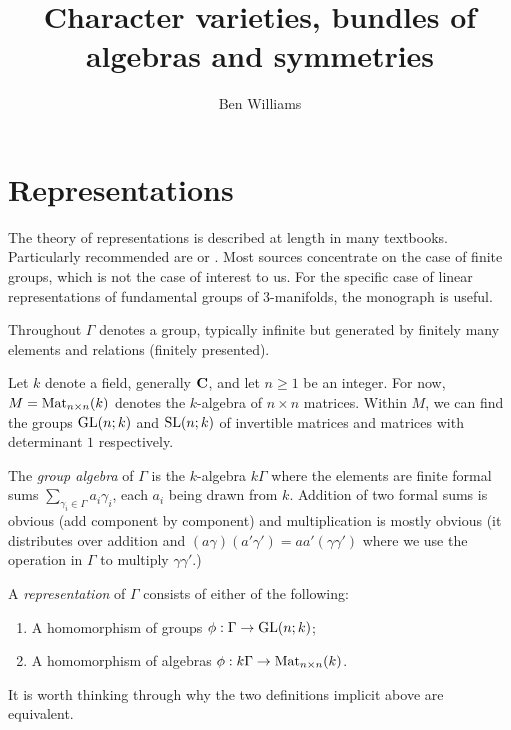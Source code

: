 \documentclass[11pt, oneside, usenames, dvipsnames, svgnames, table, final]{amsart}
\begin{document}
   

\title{Character varieties, bundles of algebras and symmetries}
\author{Ben Williams} %
\address{Department of Mathematics, University of British Columbia, Vancouver~BC V6T~1Z2, Canada}





\maketitle



\section{Representations} \label{sec:Introduction}

The theory of representations is described at length in many textbooks. Particularly recommended are \cite[Ch.~1,2 and 6]{Serre1977} or \cite{Harris2013}. Most sources concentrate on the case of finite groups, which is not the case of interest to us. For the specific case of linear representations of fundamental groups of $3$-manifolds, the monograph \cite{Shalen2002} is useful.
\medskip

Throughout $\Gamma$ denotes a group, typically infinite but generated by finitely many elements and relations (finitely
presented).

Let $k$ denote a field, generally $\mathbf{C}$, and let $n \ge 1$ be an integer. For now, $M=\operatorname{Mat}_{n \times n}(k)$ denotes the
$k$-algebra of $n\times n$ matrices. Within $M$, we can find the groups $\operatorname{GL}(n;k)$ and $\operatorname{SL}(n;k)$ of invertible matrices
and matrices with determinant $1$ respectively.

The \emph{group algebra} of $\Gamma$ is the $k$-algebra $k\Gamma$ where the elements are finite formal sums
$\sum_{\gamma_i \in \Gamma} a_i\gamma_i$, each $a_i$ being drawn from $k$. Addition of two formal sums is obvious (add
component by component) and multiplication is mostly obvious (it distributes over addition and $(a\gamma)(a' \gamma') =
aa' (\gamma \gamma')$ where we use the operation in $\Gamma$ to multiply $\gamma \gamma'$.)

A \emph{representation} of $\Gamma$ consists of either of the following:
\begin{enumerate}
\item A homomorphism of groups $\phi : \Gamma \to \operatorname{GL}(n;k)$;
\item A homomorphism of algebras $\phi: k\Gamma \to \operatorname{Mat}_{n \times n}(k)$.
\end{enumerate}
It is worth thinking through why the two definitions implicit above are equivalent.
\end{document}
